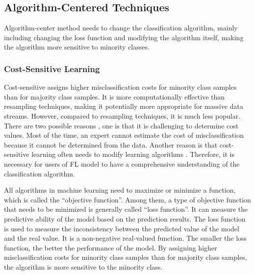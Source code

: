 \documentclass[10pt,journal,compsoc]{IEEEtran}
\begin{document}
	\subsection{Algorithm-Centered Techniques}
	Algorithm-center method needs to change the classification algorithm, mainly including changing the loss function and modifying the algorithm itself, making the algorithm more sensitive to minority classes.
	
	\subsubsection{Cost-Sensitive Learning}
	Cost-sensitive assigns higher misclassification costs for minority class samples than for majority class samples. It is more computationally effective than resampling techniques, making it potentially more appropriate for massive data streams. However, compared to resampling techniques, it is much less popular. There are two possible reasons \cite{krawczyk2014cost}, one is that it is challenging to determine cost values. Most of the time, an expert cannot estimate the cost of misclassification because it cannot be determined from the data. Another reason is that cost-sensitive learning often needs to modify learning algorithms \cite{haixiang2017learning}. Therefore, it is necessary for users of FL model to have a comprehensive understanding of the classification algorithm.
	
	All algorithms in machine learning need to maximize or minimize a function, which is called the ``objective function''. Among them, a type of objective function that needs to be minimized is generally called ``loss function''. It can measure the predictive ability of the model based on the prediction results. The loss function is used to measure the inconsistency between the predicted value of the model and the real value. It is a non-negative real-valued function. The smaller the loss function, the better the performance of the model. By assigning higher misclassification costs for minority class samples than for majority class samples, the algorithm is more sensitive to the minority class. 
	
\end{document}
